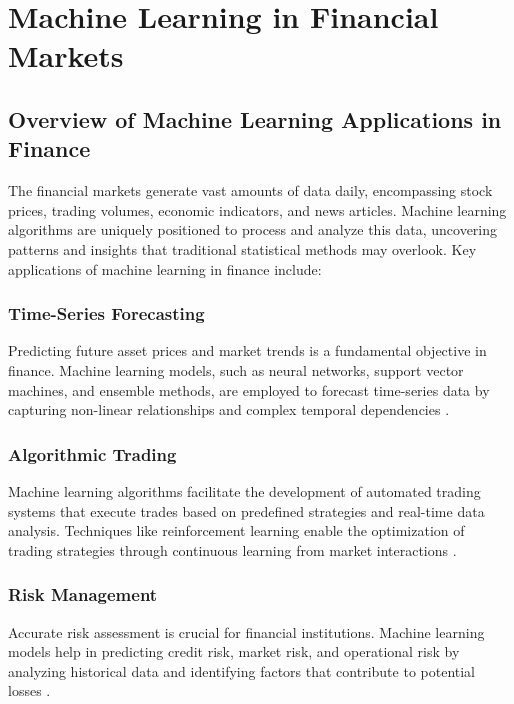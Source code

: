 \section{Machine Learning in Financial Markets}

\subsection{Overview of Machine Learning Applications in Finance}

The financial markets generate vast amounts of data daily, encompassing stock prices, trading volumes, economic indicators, and news articles. Machine learning algorithms are uniquely positioned to process and analyze this data, uncovering patterns and insights that traditional statistical methods may overlook. Key applications of machine learning in finance include:

\subsubsection{Time-Series Forecasting}

Predicting future asset prices and market trends is a fundamental objective in finance. Machine learning models, such as neural networks, support vector machines, and ensemble methods, are employed to forecast time-series data by capturing non-linear relationships and complex temporal dependencies \cite{sezer2020financial}.

\subsubsection{Algorithmic Trading}

Machine learning algorithms facilitate the development of automated trading systems that execute trades based on predefined strategies and real-time data analysis. Techniques like reinforcement learning enable the optimization of trading strategies through continuous learning from market interactions \cite{nevmyvaka2006reinforcement, deng2016deep}.
\subsubsection{Risk Management}

Accurate risk assessment is crucial for financial institutions. Machine learning models help in predicting credit risk, market risk, and operational risk by analyzing historical data and identifying factors that contribute to potential losses \cite{lessmann2015benchmarking}.

